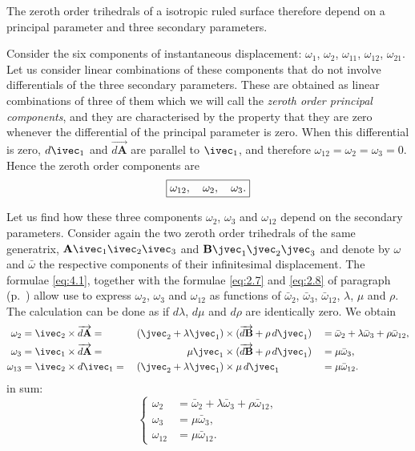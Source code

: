 The zeroth order trihedrals of a isotropic ruled surface therefore depend on a principal parameter and three secondary parameters.

Consider the six components of instantaneous displacement: $\omega_{1}$, $\omega_{2}$, $\omega_{11}$,  $\omega_{12}$, $\omega_{21}$. Let us consider linear combinations of these components that do not involve differentials of the three secondary parameters. These are obtained as linear combinations of three of them which we will call the \emph{zeroth order principal components}, and they are characterised by the property that they are zero whenever the differential of the principal parameter is zero. When this differential is zero, $d\ivec_{1}$ and $\overrightarrow{d\mathbf{A}}$ are parallel to $\ivec_{1}$, and therefore $\omega_{12}=\omega_{2}=\omega_{3}=0$. Hence the zeroth order components are
\[
\boxed{\omega_{12},\quad\omega_{2},\quad\omega_{3}.\vphantom{O}}
\]

Let us find how these three components $\omega_{2}$, $\omega_{3}$ and $\omega_{12}$ depend on the secondary parameters. Consider again the two zeroth order trihedrals of the same generatrix, $\mathbf{A}\ivec_{1}\ivec_{2}\ivec_{3}$ and $\mathbf{B}\jvec_{1}\jvec_{2}\jvec_{3}$ and denote by $\omega$ and $\bar\omega$ the respective components of their infinitesimal displacement. The formulae \eqref{eq:4.1}, together with the formulae \eqref{eq:2.7} and \eqref{eq:2.8} of paragraph  (p.~\pageref{sec:24}) allow use to express $\omega_{2}$, $\omega_{3}$ and $\omega_{12}$ as functions of $\bar\omega_{2}$, $\bar\omega_{3}$, $\bar\omega_{12}$, $\lambda$, $\mu$ and $\rho$. The calculation can be done as if $d\lambda$, $d\mu$ and $d\rho$ are identically zero. We obtain
\begin{alignat*}{6}
  \omega_{2}&=\ivec_{2}\times\overrightarrow{d\mathbf{A}}={}&{}(\jvec_{2}+\lambda\jvec_{1})&\times(\overrightarrow{d\mathbf{B}}+\rho\,{d}\jvec_{1})&&=\bar\omega_{2}+\lambda\bar\omega_{3}+\rho\bar\omega_{12},\\
  \omega_{3}&=\ivec_{1}\times\overrightarrow{d\mathbf{A}}={}&\mu\jvec_{1}&\times(\overrightarrow{d\mathbf{B}}+\rho\,{d}\jvec_{1})&&=\mu\bar\omega_{3},\\
  \omega_{13}&=\ivec_{2}\times d\ivec_{1}={}&{}(\jvec_{2}+\lambda\jvec_{1})&\times\mu\,d\jvec_{1}&&=\mu\bar\omega_{12}.
\end{alignat*}
in sum:
\begin{equation}
  \label{eq:4.2}
  \left\{
    \begin{aligned}
      \omega_{2}&=\bar\omega_{2}+\lambda\bar\omega_{3}+\rho\bar\omega_{12},\\
      \omega_{3}&=\mu\bar\omega_{3},\\
      \omega_{12}&=\mu\bar\omega_{12}.
    \end{aligned}
  \right.
\end{equation}

